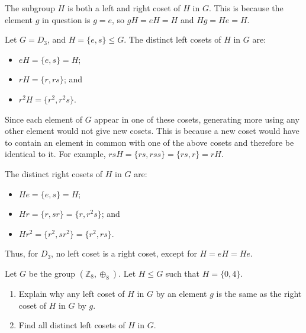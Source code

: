 \begin{remark}
    The subgroup $H$ is both a left and right coset of $H$ in $G$. This is because the element $g$ in question is $g = e$, so $gH = eH = H$ and $Hg = He = H$.
\end{remark}

\begin{example}
    Let $G = D_3$, and $H = \{e, s\} \leq G$. The distinct left cosets of $H$ in $G$ are:
    \begin{itemize}
        \item $eH = \{e, s\} = H$;
        \item $rH = \{r, rs\}$; and
        \item $r^2H = \{r^2, r^2s\}$.
    \end{itemize}
    Since each element of $G$ appear in one of these cosets, generating more using any other element would not give new cosets. This is because a new coset would have to contain an element in common with one of the above cosets and therefore be identical to it. For example, $rsH = \{rs, rss\} = \{rs, r\} = rH$.

    The distinct right cosets of $H$ in $G$ are:
    \begin{itemize}
        \item $He = \{e, s\} = H$;
        \item $Hr = \{r, sr\} = \{r, r^2s\}$; and
        \item $Hr^2 = \{r^2, sr^2\} = \{r^2, rs\}$.
    \end{itemize}
    Thus, for $D_3$, no left coset is a right coset, except for $H = eH = He$.
\end{example}

\begin{exercise}
    Let $G$ be the group $(\mathbb{Z}_8, \oplus_8)$. Let $H \leq G$ such that $H
 = \{0, 4\}$.
    \begin{enumerate}[label=(\alph*)]
        \item Explain why any left coset of $H$ in $G$ by an element $g$ is the same as the right coset of $H$ in $G$ by $g$.
        \item Find all distinct left cosets of $H$ in $G$.
    \end{enumerate}
\end{exercise}

